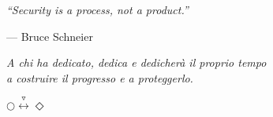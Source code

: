 \thispagestyle{empty}

\vspace*{\fill}

\begin{flushright}
    \begin{minipage}{0.65\textwidth}
        \raggedleft

        \textit{``Security is a process, not a product.''}

        \vspace{0.5cm}

        --- Bruce Schneier
    \end{minipage}
\end{flushright}

\vspace*{\fill}

\begin{center}
    \textit{A chi ha dedicato, dedica e dedicherà il proprio tempo\\
    a costruire il progresso e a proteggerlo.}

    $\bigcirc \overset{\triangledown}{\longleftrightarrow} \Diamond$

\end{center}

\vspace*{1.2cm}